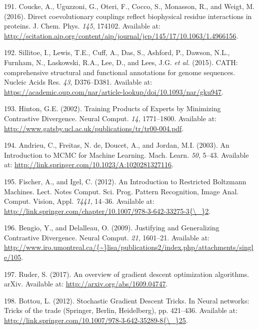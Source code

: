 \documentclass[11pt,a4paper,twoside]{book}
\theoremstyle{definition}
\theoremstyle{definition}
\theoremstyle{remark}
\begin{document}
\hypertarget{ref-Coucke2016}{}
191. Coucke, A., Uguzzoni, G., Oteri, F., Cocco, S., Monasson, R., and
Weigt, M. (2016). Direct coevolutionary couplings reflect biophysical
residue interactions in proteins. J. Chem. Phys. \emph{145}, 174102.
Available at:
\url{http://scitation.aip.org/content/aip/journal/jcp/145/17/10.1063/1.4966156}.

\hypertarget{ref-Sillitoe2015}{}
192. Sillitoe, I., Lewis, T.E., Cuff, A., Das, S., Ashford, P., Dawson,
N.L., Furnham, N., Laskowski, R.A., Lee, D., and Lees, J.G. \emph{et
al.} (2015). CATH: comprehensive structural and functional annotations
for genome sequences. Nucleic Acids Res. \emph{43}, D376--D381.
Available at:
\url{https://academic.oup.com/nar/article-lookup/doi/10.1093/nar/gku947}.

\hypertarget{ref-Hinton2002}{}
193. Hinton, G.E. (2002). Training Products of Experts by Minimizing
Contrastive Divergence. Neural Comput. \emph{14}, 1771--1800. Available
at: \url{http://www.gatsby.ucl.ac.uk/publications/tr/tr00-004.pdf}.

\hypertarget{ref-Andrieu2003}{}
194. Andrieu, C., Freitas, N. de, Doucet, A., and Jordan, M.I. (2003).
An Introduction to MCMC for Machine Learning. Mach. Learn. \emph{50},
5--43. Available at:
\url{http://link.springer.com/10.1023/A:1020281327116}.

\hypertarget{ref-Fischer2012}{}
195. Fischer, A., and Igel, C. (2012). An Introduction to Restricted
Boltzmann Machines. Lect. Notes Comput. Sci. Prog. Pattern Recognition,
Image Anal. Comput. Vision, Appl. \emph{7441}, 14--36. Available at:
\href{http://link.springer.com/chapter/10.1007/978-3-642-33275-3\%7B/_\%7D2}{http://link.springer.com/chapter/10.1007/978-3-642-33275-3\{\textbackslash{}\_\}2}.

\hypertarget{ref-Bengio2009}{}
196. Bengio, Y., and Delalleau, O. (2009). Justifying and Generalizing
Contrastive Divergence. Neural Comput. \emph{21}, 1601--21. Available
at:
\href{http://www.iro.umontreal.ca/\%7B~\%7Dlisa/publications2/index.php/attachments/single/105}{http://www.iro.umontreal.ca/\{\textasciitilde{}\}lisa/publications2/index.php/attachments/single/105}.

\hypertarget{ref-Ruder2017}{}
197. Ruder, S. (2017). An overview of gradient descent optimization
algorithms. arXiv. Available at: \url{http://arxiv.org/abs/1609.04747}.

\hypertarget{ref-Bottou2012}{}
198. Bottou, L. (2012). Stochastic Gradient Descent Tricks. In Neural
networks: Tricks of the trade (Springer, Berlin, Heidelberg), pp.
421--436. Available at:
\href{http://link.springer.com/10.1007/978-3-642-35289-8\%7B/_\%7D25}{http://link.springer.com/10.1007/978-3-642-35289-8\{\textbackslash{}\_\}25}.
\end{document}
